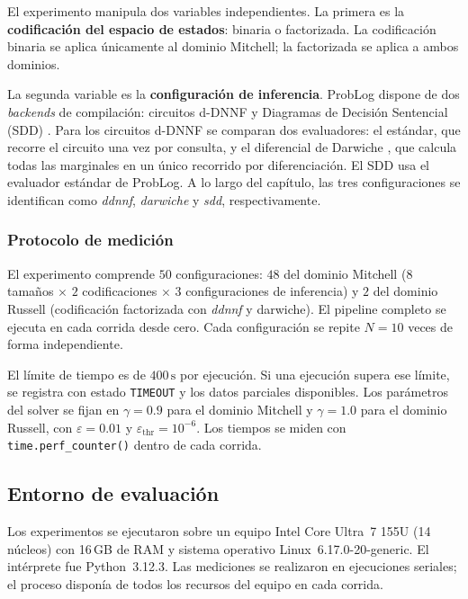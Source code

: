 El experimento manipula dos variables independientes. La primera es la
\textbf{codificación del espacio de estados}: binaria o factorizada. La
codificación binaria se aplica únicamente al dominio Mitchell; la
factorizada se aplica a ambos dominios.

La segunda variable es la \textbf{configuración de inferencia}. ProbLog
dispone de dos \textit{backends} de compilación: circuitos d-DNNF
\cite{darwiche2003differential} y Diagramas de Decisión Sentencial (SDD)
\cite{darwiche2011sdd}. Para los circuitos d-DNNF se comparan dos evaluadores:
el estándar, que recorre el circuito una vez por consulta, y el diferencial de
Darwiche \cite{darwiche2003differential}, que calcula todas las marginales en
un único recorrido por diferenciación. El SDD usa el evaluador estándar de
ProbLog. A lo largo del capítulo, las tres configuraciones se identifican como
\textit{ddnnf}, \textit{darwiche} y \textit{sdd}, respectivamente.

\subsubsection{Protocolo de medición}
\label{sec:exp-protocolo}

El experimento comprende $50$ configuraciones: $48$ del dominio Mitchell
($8$ tamaños $\times$ $2$ codificaciones $\times$ $3$ configuraciones de
inferencia) y $2$ del dominio Russell (codificación factorizada con
\textit{ddnnf} y darwiche). El pipeline completo se ejecuta en cada corrida
desde cero. Cada configuración se repite
$N = 10$ veces de forma independiente.

El límite de tiempo es de $400\,\text{s}$ por ejecución. Si una ejecución
supera ese límite, se registra con estado \texttt{TIMEOUT} y los datos
parciales disponibles. Los parámetros del solver se fijan en $\gamma = 0.9$
para el dominio Mitchell y $\gamma = 1.0$ para el dominio Russell, con
$\varepsilon = 0.01$ y $\varepsilon_{\text{thr}} = 10^{-6}$. Los tiempos
se miden con \texttt{time.perf\_counter()} dentro de cada corrida.

\subsection{Entorno de evaluación}
\label{sec:exp-entorno}

Los experimentos se ejecutaron sobre un equipo Intel\textregistered{} Core\texttrademark{} Ultra~7 155U (14 núcleos) con 16\,GB de RAM y sistema operativo Linux~6.17.0-20-generic. El intérprete fue Python~3.12.3. Las mediciones se realizaron en ejecuciones seriales; el proceso disponía de todos los recursos del equipo en cada corrida.

